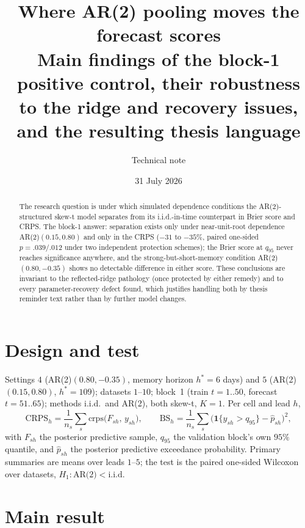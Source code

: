 \documentclass[11pt]{article}
\title{\textbf{Where AR(2) pooling moves the forecast scores}\\[2pt]
\large Main findings of the block-1 positive control, their robustness\\
to the ridge and recovery issues, and the resulting thesis language}
\author{Technical note}
\date{31 July 2026}
\begin{document}
\maketitle

\begin{abstract}
The research question is under which simulated dependence conditions the
AR(2)-structured skew-t model separates from its i.i.d.-in-time
counterpart in Brier score and CRPS. The block-1 answer: separation
exists only under near-unit-root dependence AR(2)$(0.15, 0.80)$ and only
in the CRPS ($-31$ to $-35\%$, paired one-sided $p = .039/.012$ under
two independent protection schemes); the Brier score at $q_{95}$ never
reaches significance anywhere, and the strong-but-short-memory condition
AR(2)$(0.80, -0.35)$ shows no detectable difference in either score.
These conclusions are invariant to the reflected-ridge pathology (once
protected by either remedy) and to every parameter-recovery defect
found, which justifies handling both by thesis reminder text rather than
by further model changes.
\end{abstract}

\section{Design and test}

Settings $4$ (AR(2)$(0.80,-0.35)$, memory horizon $h^\ast=6$ days) and
$5$ (AR(2)$(0.15,0.80)$, $h^\ast=109$); datasets $1$--$10$; block~1
(train $t=1..50$, forecast $t=51..65$); methods i.i.d.\ and AR(2), both
skew-t, $K=1$. Per cell and lead $h$,
\begin{equation}
  \mathrm{CRPS}_h = \frac{1}{n_s}\sum_{s}
  \mathrm{crps}\big(F_{sh},\, y_{sh}\big),
  \qquad
  \mathrm{BS}_h = \frac{1}{n_s}\sum_{s}
  \big(\mathbf{1}\{y_{sh} > q_{95}\} - \hat p_{sh}\big)^2,
\end{equation}
with $F_{sh}$ the posterior predictive sample, $q_{95}$ the validation
block's own $95\%$ quantile, and $\hat p_{sh}$ the posterior predictive
exceedance probability. Primary summaries are means over leads $1$--$5$;
the test is the paired one-sided Wilcoxon over datasets,
$H_1\!: \text{AR(2)} < \text{i.i.d.}$

\section{Main result}
\end{document}
